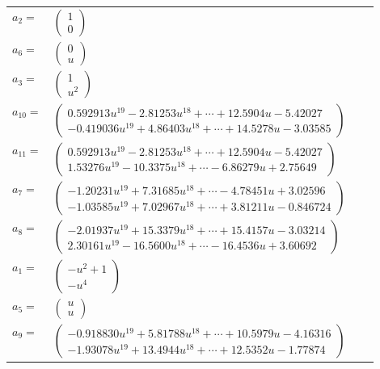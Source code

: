 \documentclass[1p]{elsarticle_modified}
\theoremstyle{definition}
\begin{document}
\begin{tabular}{m{7pt} m{180pt} m{7pt} m{180pt} }
\flushright $a_{2}=$&$\begin{pmatrix}1\\0\end{pmatrix}$ \\
\flushright $a_{6}=$&$\begin{pmatrix}0\\u\end{pmatrix}$ \\
\flushright $a_{3}=$&$\begin{pmatrix}1\\u^2\end{pmatrix}$ \\
\flushright $a_{10}=$&$\begin{pmatrix}0.592913 u^{19}-2.81253 u^{18}+\cdots+12.5904 u-5.42027\\-0.419036 u^{19}+4.86403 u^{18}+\cdots+14.5278 u-3.03585\end{pmatrix}$ \\
\flushright $a_{11}=$&$\begin{pmatrix}0.592913 u^{19}-2.81253 u^{18}+\cdots+12.5904 u-5.42027\\1.53276 u^{19}-10.3375 u^{18}+\cdots-6.86279 u+2.75649\end{pmatrix}$ \\
\flushright $a_{7}=$&$\begin{pmatrix}-1.20231 u^{19}+7.31685 u^{18}+\cdots-4.78451 u+3.02596\\-1.03585 u^{19}+7.02967 u^{18}+\cdots+3.81211 u-0.846724\end{pmatrix}$ \\
\flushright $a_{8}=$&$\begin{pmatrix}-2.01937 u^{19}+15.3379 u^{18}+\cdots+15.4157 u-3.03214\\2.30161 u^{19}-16.5600 u^{18}+\cdots-16.4536 u+3.60692\end{pmatrix}$ \\
\flushright $a_{1}=$&$\begin{pmatrix}- u^2+1\\- u^4\end{pmatrix}$ \\
\flushright $a_{5}=$&$\begin{pmatrix}u\\u\end{pmatrix}$ \\
\flushright $a_{9}=$&$\begin{pmatrix}-0.918830 u^{19}+5.81788 u^{18}+\cdots+10.5979 u-4.16316\\-1.93078 u^{19}+13.4944 u^{18}+\cdots+12.5352 u-1.77874\end{pmatrix}$ \\

\end{tabular}
\end{document}
